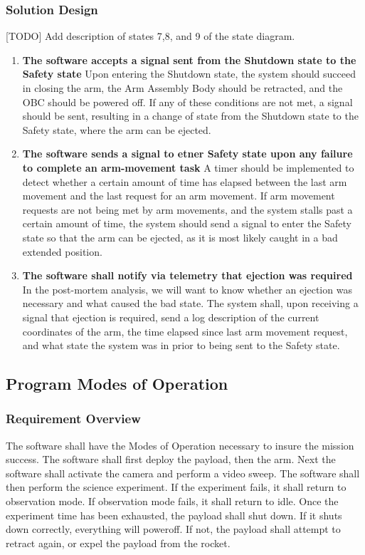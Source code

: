 \documentclass[letterpaper,10pt]{article}
\begin{document}
\subsubsection{Solution Design}
[TODO] Add description of states 7,8, and 9 of the state diagram.
\begin{enumerate}
\item{
\textbf{The software accepts a signal sent from the Shutdown state to the Safety state}
Upon entering the Shutdown state, the system should succeed in closing the arm, the Arm Assembly Body should be retracted, 
and the OBC should be powered off. If any of these conditions are not met, a signal should be sent, resulting in a change of state
from the Shutdown state to the Safety state, where the arm can be ejected.
}
\item{
	\textbf{The software sends a signal to etner Safety state upon any failure to complete an arm-movement task}
A timer should be implemented to detect whether a certain amount of time has elapsed between the last arm movement and the last 
request for an arm movement. If arm movement requests are not being met by arm movements, and the system stalls past a certain amount 
of time, the system should send a signal to enter the Safety state so that the arm can be ejected, as it is most likely caught
in a bad extended position.
}
\item{
	\textbf{The software shall notify via telemetry that ejection was required}
In the post-mortem analysis, we will want to know whether an ejection was necessary and what caused the bad state. The system
shall, upon receiving a signal that ejection is required, send a log description of the current coordinates of the arm, the time 
elapsed since last arm movement request, and what state the system was in prior to being sent to the Safety state.
}
\end{enumerate}

\subsection{Program Modes of Operation}
\subsubsection{Requirement Overview}
The software shall have the Modes of Operation necessary to insure the mission success.
The software shall first deploy the payload, then the arm. Next the software shall activate the 
camera and perform a video sweep. The software shall then perform the science experiment.
If the experiment fails, it shall return to observation mode.
If observation mode fails, it shall return to idle.
Once the experiment time has been exhausted, the payload shall shut down.
If it shuts down correctly, everything will poweroff. If not, the payload shall attempt to retract 
again, or expel the payload from the rocket.
\end{document}
